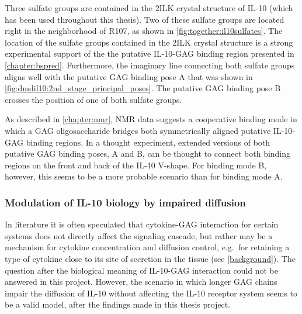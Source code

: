 Three sulfate groups are contained in the 2ILK crystal structure of IL-10 (which
has been used throughout this thesis). Two of these sulfate groups are located
right in the neighborhood of R107, as shown in \cref{fig:together:il10sulfates}.
The location of the sulfate groups contained in the 2ILK crystal structure is a
strong experimental support of the the putative IL-10-GAG binding region
presented in \cref{chapter:bspred}. Furthermore, the imaginary line connecting
both sulfate groups aligns well with the putative GAG binding pose A that was
shown in \cref{fig:dmdil10:2nd_stage_principal_poses}. The putative GAG binding
pose B crosses the position of one of both sulfate groups.

As described in \cref{chapter:nmr}, NMR data suggests a cooperative binding mode
in which a GAG oligosaccharide bridges both symmetrically aligned putative
IL-10-GAG binding regions. In a thought experiment, extended versions of both
putative GAG binding poses, A and B, can be thought to connect both binding
regions on the front and back of the IL-10 V-shape. For binding mode B, however,
this seems to be a more probable scenario than for binding mode A.



\subsubsection{Modulation of IL-10 biology by impaired diffusion}

In literature it is often speculated that cytokine-GAG interaction for certain
systems does not directly affect the signaling cascade, but rather may be a
mechanism for cytokine concentration and diffusion control, e.g.\ for retaining
a type of cytokine close to its site of secretion in the tissue (see
\cref{background}). The question after the biological meaning of IL-10-GAG
interaction could not be answered in this project. However, the scenario in
which longer GAG chains impair the diffusion of IL-10 without affecting the
IL-10 receptor system seems to be a valid model, after the findings made in this
thesis project.

